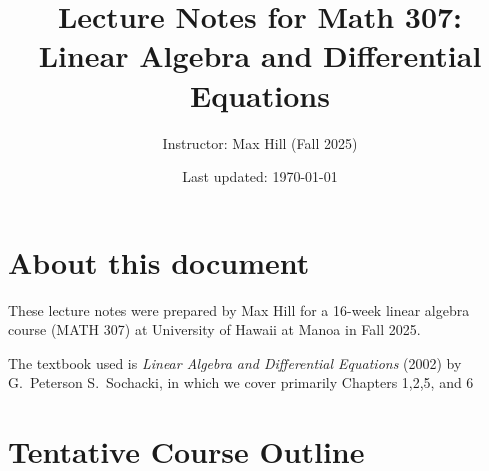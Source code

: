 \documentclass[10pt]{article}
\title{Lecture Notes for Math 307:\\Linear Algebra and Differential Equations}
\author{Instructor: Max Hill (Fall 2025)}
\date{Last updated: \today}
\theoremstyle{definition}
\begin{document}
\maketitle
\tableofcontents

\section*{About this document}

These lecture notes were prepared by Max Hill for a 16-week linear algebra course  (MATH
307) at University of Hawaii at Manoa in Fall 2025.

The textbook used is \textit{Linear Algebra and Differential Equations} (2002)
by G.~Peterson S.~Sochacki, in which we cover primarily Chapters 1,2,5, and 6


\newpage
\setcounter{section}{-1}
\section{Tentative Course Outline}
\end{document}
